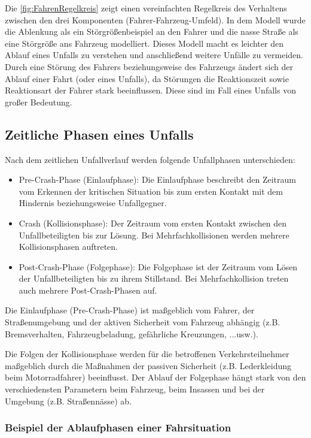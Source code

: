 Die \autoref{fig:FahrenRegelkreis} zeigt einen vereinfachten Regelkreis des Verhaltens zwischen den drei Komponenten (Fahrer-Fahrzeug-Umfeld). In dem Modell wurde die Ablenkung als ein Störgrößenbeispiel an den Fahrer und die nasse Straße als eine Störgröße ans Fahrzeug modelliert. Dieses Modell macht es leichter den Ablauf eines Unfalls zu verstehen und anschließend weitere Unfälle zu vermeiden. Durch eine Störung des Fahrers beziehungsweise des Fahrzeugs ändert sich der Ablauf einer Fahrt (oder eines Unfalls), da Störungen die Reaktionszeit sowie Reaktionsart der Fahrer stark beeinflussen. Diese sind im Fall eines Unfalls von großer Bedeutung. \\


%
\subsection{Zeitliche Phasen eines Unfalls}

Nach dem zeitlichen Unfallverlauf werden folgende Unfallphasen unterschieden:
\begin{itemize}
	\item Pre-Crash-Phase (Einlaufphase): 
	Die Einlaufphase beschreibt den Zeitraum vom Erkennen der kritischen Situation bis zum ersten Kontakt mit dem Hindernis beziehungsweise Unfallgegner.
	\item Crash (Kollisionsphase):
	Der Zeitraum vom ersten Kontakt zwischen den Unfallbeteiligten bis zur Lösung. Bei Mehrfachkollisionen werden mehrere Kollisionsphasen auftreten.
	\item Post-Crash-Phase (Folgephase):
	Die Folgephase ist der Zeitraum vom Lösen der Unfallbeteiligten bis zu ihrem Stillstand. Bei Mehrfachkollision treten auch mehrere Post-Crash-Phasen auf. 
	
\end{itemize}
Die Einlaufphase (Pre-Crash-Phase) ist maßgeblich vom Fahrer, der Straßenumgebung und der aktiven Sicherheit vom Fahrzeug abhängig (z.B. Bremsverhalten, Fahrzeugbeladung, gefährliche Kreuzungen, ...usw.).
 
Die Folgen der Kollisionsphase werden für die betroffenen Verkehrsteilnehmer maßgeblich durch die Maßnahmen der passiven Sicherheit (z.B. Lederkleidung beim Motorradfahrer) beeinflusst. Der Ablauf der Folgephase hängt stark von den verschiedensten Parametern beim Fahrzeug, beim Insassen und bei der Umgebung (z.B. Straßennässe) ab.\citep{Appel2002}\\


\subsubsection{Beispiel der Ablaufphasen einer Fahrsituation}

